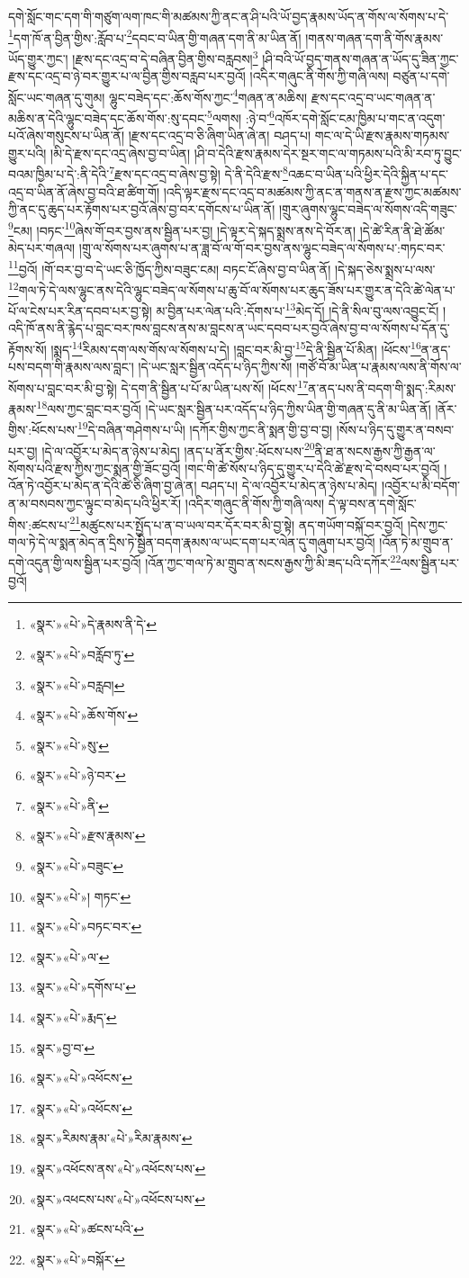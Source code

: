 དགེ་སློང་གང་དག་གི་གཙུག་ལག་ཁང་གི་མཚམས་ཀྱི་ནང་ན་ཤི་པའི་ཡོ་བྱད་རྣམས་ཡོད་ན་གོས་ལ་སོགས་པ་དེ་\footnote{«སྣར་»«པེ་»དེ་རྣམས་ནི་དེ་}དག་ཁོ་ན་བྱིན་གྱིས་:རློབ་པ་\footnote{«སྣར་»«པེ་»བརློབ་ཏུ་}དབང་བ་ཡིན་གྱི་གཞན་དག་ནི་མ་ཡིན་ནོ། །གནས་གཞན་དག་ནི་གོས་རྣམས་ཡོད་གྱུར་ཀྱང་། །རྫས་དང་འདྲ་བ་དེ་བཞིན་བྱིན་གྱིས་བརླབས།\footnote{«སྣར་»«པེ་»བརླབ།} །ཤི་བའི་ཡོ་བྱད་གནས་གཞན་ན་ཡོད་དུ་ཟིན་ཀྱང་རྫས་དང་འདྲ་བ་ཉེ་བར་གྱུར་པ་ལ་བྱིན་གྱིས་བརླབ་པར་བྱའོ། །འདིར་གཞུང་ནི་གོས་ཀྱི་གཞི་ལས། བཙུན་པ་དགེ་སློང་ཡང་གཞན་དུ་གུམ། ལྷུང་བཟེད་དང་:ཆོས་གོས་ཀྱང་\footnote{«སྣར་»«པེ་»ཆོས་གོས་}གཞན་ན་མཆིས། རྫས་དང་འདྲ་བ་ཡང་གཞན་ན་མཆིས་ན་དེའི་ལྷུང་བཟེད་དང་ཆོས་གོས་:སུ་དབང་\footnote{«སྣར་»«པེ་»སུ་}ལགས། :ཉེ་བ་\footnote{«སྣར་»«པེ་»ཉེ་བར་}འཁོར་དགེ་སློང་ངམ་ཁྱིམ་པ་གང་ན་འདུག་པའོ་ཞེས་གསུངས་པ་ཡིན་ནོ། །རྫས་དང་འདྲ་བ་ཅི་ཞིག་ཡིན་ཞེ་ན། བཤད་པ། གང་ལ་དེ་ཡི་རྫས་རྣམས་གཏམས་གྱུར་པའི། །མི་དེ་རྫས་དང་འདྲ་ཞེས་བྱ་བ་ཡིན། །ཤི་བ་དེའི་རྫས་རྣམས་དེར་སྔར་གང་ལ་གཏམས་པའི་མི་རབ་ཏུ་བྱུང་བའམ་ཁྱིམ་པ་དེ་:ནི་དེའི་\footnote{«སྣར་»«པེ་»ནི་}རྫས་དང་འདྲ་བ་ཞེས་བྱ་སྟེ། དེ་ནི་དེའི་རྫས་\footnote{«སྣར་»«པེ་»རྫས་རྣམས་}འཆང་བ་ཡིན་པའི་ཕྱིར་དེའི་སྐྱིན་པ་དང་འདྲ་བ་ཡིན་ནོ་ཞེས་བྱ་བའི་ཐ་ཚིག་གོ། །འདི་ལྟར་རྫས་དང་འདྲ་བ་མཚམས་ཀྱི་ནང་ན་གནས་ན་རྫས་ཀྱང་མཚམས་ཀྱི་ནང་དུ་ཆུད་པར་རྟོགས་པར་བྱའོ་ཞེས་བྱ་བར་དགོངས་པ་ཡིན་ནོ། །གྲུར་ཞུགས་ལྷུང་བཟེད་ལ་སོགས་འདི་གཟུང་\footnote{«སྣར་»«པེ་»བཟུང་}ངམ། །བཏང་\footnote{«སྣར་»«པེ་»། གཏང་}ཞེས་གོ་བར་བྱས་ནས་སྦྱིན་པར་བྱ། །དེ་ལྟར་དེ་སྐད་སྨྲས་ནས་དེ་བོར་ན། །དེ་ཚེ་རིན་ནི་ཐེ་ཚོམ་མེད་པར་གཞལ། །གྲུ་ལ་སོགས་པར་ཞུགས་པ་ན་ཟླ་བོ་ལ་གོ་བར་བྱས་ནས་ལྷུང་བཟེད་ལ་སོགས་པ་:གཏང་བར་\footnote{«སྣར་»«པེ་»བཏང་བར་}བྱའོ། །གོ་བར་བྱ་བ་དེ་ཡང་ཅི་ཁྱོད་ཀྱིས་བཟུང་ངམ། བཏང་ངོ་ཞེས་བྱ་བ་ཡིན་ནོ། །དེ་སྐད་ཅེས་སྨྲས་པ་ལས་\footnote{«སྣར་»«པེ་»ལ་}གལ་ཏེ་དེ་ལས་ལྷུང་ནས་དེའི་ལྷུང་བཟེད་ལ་སོགས་པ་ཆུ་བོ་ལ་སོགས་པར་ཆུད་ཟོས་པར་གྱུར་ན་དེའི་ཚེ་ལེན་པ་པོ་ལ་ངེས་པར་རིན་དབབ་པར་བྱ་སྟེ། མ་བྱིན་པར་ལེན་པའི་:དོགས་པ་\footnote{«སྣར་»«པེ་»དགོས་པ་}མེད་དོ། །དེ་ནི་སིལ་བུ་ལས་འབྱུང་ངོ། །འདི་ཁོ་ནས་ནི་རྙེད་པ་བླང་བར་ཁས་བླངས་ནས་མ་བླངས་ན་ཡང་དབབ་པར་བྱའོ་ཞེས་བྱ་བ་ལ་སོགས་པ་དོན་དུ་རྟོགས་སོ། །སྨད་\footnote{«སྣར་»«པེ་»རྨད་}རིམས་དག་ལས་གོས་ལ་སོགས་པ་དེ། །བླང་བར་མི་བྱ་\footnote{«སྣར་»བྱ་བ་}དེ་ནི་སྦྱིན་པོ་མིན། །ཕོངས་\footnote{«སྣར་»«པེ་»འཕོངས་}ན་ནད་པས་བདག་གི་རྣམས་ལས་བླང་། །དེ་ཡང་སླར་སྦྱིན་འདོད་པ་ཉིད་ཀྱིས་སོ། །གཙོ་བོ་མ་ཡིན་པ་རྣམས་ལས་ནི་གོས་ལ་སོགས་པ་བླང་བར་མི་བྱ་སྟེ། དེ་དག་ནི་སྦྱིན་པ་པོ་མ་ཡིན་པས་སོ། །ཕོངས་\footnote{«སྣར་»«པེ་»འཕོངས་}ན་ནད་པས་ནི་བདག་གི་སྨད་:རིམས་རྣམས་\footnote{«སྣར་»རིམས་རྣམ་«པེ་»རིམ་རྣམས་}ལས་ཀྱང་བླང་བར་བྱའོ། །དེ་ཡང་སླར་སྦྱིན་པར་འདོད་པ་ཉིད་ཀྱིས་ཡིན་གྱི་གཞན་དུ་ནི་མ་ཡིན་ནོ། །ནོར་གྱིས་:ཕོངས་པས་\footnote{«སྣར་»འཕོངས་ནས་«པེ་»འཕོངས་པས་}དེ་བཞིན་གཤེགས་པ་ཡི། །དཀོར་གྱིས་ཀྱང་ནི་སྨན་གྱི་བྱ་བ་བྱ། །སོས་པ་ཉིད་དུ་གྱུར་ན་བསབ་པར་བྱ། །དེ་ལ་འབྱོར་པ་མེད་ན་ཉེས་པ་མེད། །ནད་པ་ནོར་གྱིས་:ཕོངས་པས་\footnote{«སྣར་»འཕངས་པས་«པེ་»འཕོངས་པས་}ནི་ཐ་ན་སངས་རྒྱས་ཀྱི་རྒྱན་ལ་སོགས་པའི་རྫས་ཀྱིས་ཀྱང་སྨན་གྱི་ཟོང་བྱའོ། །གང་གི་ཚེ་སོས་པ་ཉིད་དུ་གྱུར་པ་དེའི་ཚེ་རྫས་དེ་བསབ་པར་བྱའོ། །འོན་ཏེ་འབྱོར་པ་མེད་ན་དེའི་ཚེ་ཅི་ཞིག་བྱ་ཞེ་ན། བཤད་པ། དེ་ལ་འབྱོར་པ་མེད་ན་ཉེས་པ་མེད། །འབྱོར་པ་མི་བདོག་ན་མ་བསབས་ཀྱང་ལྟུང་བ་མེད་པའི་ཕྱིར་རོ། །འདིར་གཞུང་ནི་གོས་ཀྱི་གཞི་ལས། དེ་ལྟ་བས་ན་དགེ་སློང་གིས་:ཚངས་པ་\footnote{«སྣར་»«པེ་»ཚངས་པའི་}མཚུངས་པར་སྤྱོད་པ་ན་བ་ཡལ་བར་དོར་བར་མི་བྱ་སྟེ། ནད་གཡོག་བསྐོ་བར་བྱའོ། །དེས་ཀྱང་གལ་ཏེ་དེ་ལ་སྨན་མེད་ན་དྲིས་ཏེ་སྦྱིན་བདག་རྣམས་ལ་ཡང་དག་པར་ལེན་དུ་གཞུག་པར་བྱའོ། །འོན་ཏེ་མ་གྲུབ་ན་དགེ་འདུན་གྱི་ལས་སྦྱིན་པར་བྱའོ། །འོན་ཀྱང་གལ་ཏེ་མ་གྲུབ་ན་སངས་རྒྱས་ཀྱི་མི་ཟད་པའི་དཀོར་\footnote{«སྣར་»«པེ་»བསྐོར་}ལས་སྦྱིན་པར་བྱའོ། 